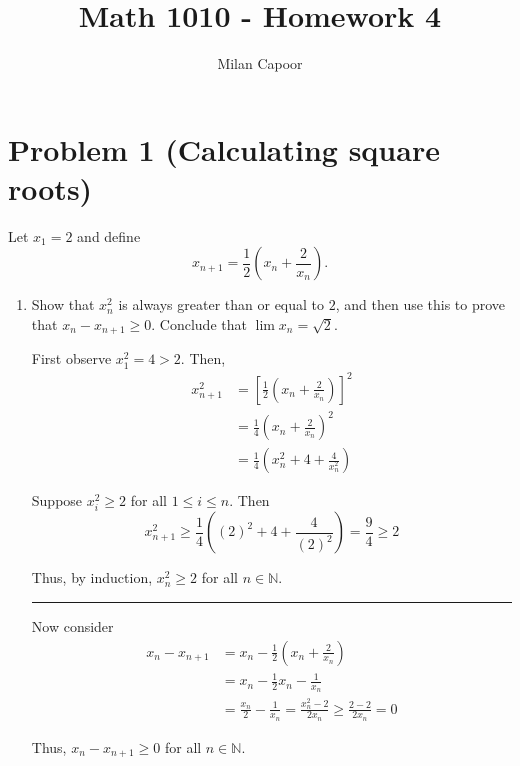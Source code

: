 \documentclass[12pt]{article}
\title{Math 1010 - Homework 4}
\author{Milan Capoor}
\date{}
\begin{document}
\maketitle
        
\section{Problem 1 (Calculating square roots)}
Let $x_1=2$ and define
\begin{equation*}
x_{n+1}=\frac{1}{2}\left(x_n+\frac{2}{x_n} \right).
\end{equation*}
\begin{enumerate}
	\item Show that $x_n^2$ is always greater than or equal to $2$, and then use this to prove that $x_n-x_{n+1}\geq0$. Conclude that $\lim x_n=\sqrt{2}$.
	
        \color{blue}
            First observe $x_1^2 = 4 > 2$. Then, 
            \begin{align*}
                x_{n+1}^2 &= \left[\frac{1}{2}\left(x_n + \frac{2}{x_n}\right)\right]^2\\ 
                    &= \frac{1}{4}\left(x_n + \frac{2}{x_n}\right)^2\\ 
                    &= \frac{1}{4}(x_n^2 + 4 + \frac{4}{x_n^2})
            \end{align*}

            Suppose $x_i^2 \geq 2$ for all $1 \leq i \leq n$. Then 
            \[x_{n+1}^2 \geq \frac{1}{4}((2)^2 + 4 + \frac{4}{(2)^2}) = \frac{9}{4} \geq 2\]
            
            Thus, by induction, $x_n^2 \geq 2$ for all $n \in \mathbb{N}$. 
            
            \vspace*{10pt}
            \hrule 
            \vspace*{10pt}

            Now consider 
            \begin{align*}
                x_n - x_{n+1} &= x_n - \frac{1}{2}\left(x_n + \frac{2}{x_n}\right)\\
                    &= x_n - \frac{1}{2}x_n - \frac{1}{x_n}\\
                    &= \frac{x_n}{2} - \frac{1}{x_n} = \frac{x_n^2 - 2}{2x_n} \geq \frac{2 - 2}{2x_n} = 0
            \end{align*}

            Thus, $x_n - x_{n+1} \geq 0$ for all $n \in \mathbb{N}$.


\end{enumerate}
\end{document}
